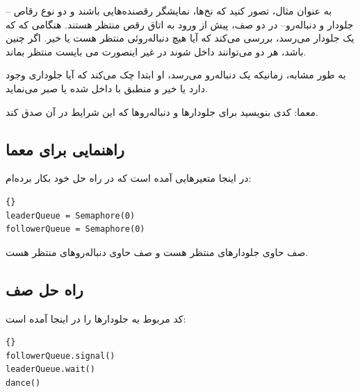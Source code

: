 \documentclass{book}
\newcommand{\clearemptydoublepage}{\newpage\cleardoublepage}
\begin{document}
    به عنوان مثال، تصور کنید که نخ‌ها، نمایشگر رقصنده‌هایی باشند و دو نوع رقاص --جلودار و  دنباله‌رو--
    در دو صف، پیش از ورود به اتاق رقص منتظر هستند. 
    هنگامی که که یک جلودار می‌رسد، بررسی می‌کند که آیا هیچ دنباله‌روئی منتظر هست یا خیر. 
    اگر چنین باشد، هر دو می‌توانند داخل شوند در غیر اینصورت می بایست منتظر بماند.

    به طور مشابه، زمانیکه یک دنباله‌رو می‌رسد، او ابتدا چک می‌کند که آیا جلوداری وجود دارد یا خیر و منطبق با داخل شده یا صبر می‌نماید. 

    معما:  کدی بنویسید برای جلو‌دارها و دنباله‌رو‌ها که این شرایط در آن صدق کند.


\clearemptydoublepage
\subsection {راهنمایی برای معما}

    در اینجا متعیرهایی آمده است که در راه حل خود بکار برده‌ام: 

\begin{latin}
\begin{latin}
\begin{lstlisting}[title=\rl{راهنمایی صف}]{}
leaderQueue = Semaphore(0)
followerQueue = Semaphore(0)
\end{lstlisting}
\end{latin}
\end{latin}

     صف حاوی جلو‌دارهای منتظر هست و
 صف حاوی دنباله‌رو‌های منتظر هست.



\clearemptydoublepage
\subsection {راه حل صف}

    کد مربوط به جلو‌دارها را در اینجا آمده است:

\begin{latin}
\begin{latin}
\begin{lstlisting}[title=\rl{راه حل صف (جلودارها)}]{}
followerQueue.signal()
leaderQueue.wait()
dance()
\end{lstlisting}
\end{latin}
\end{latin}
\end{document}
